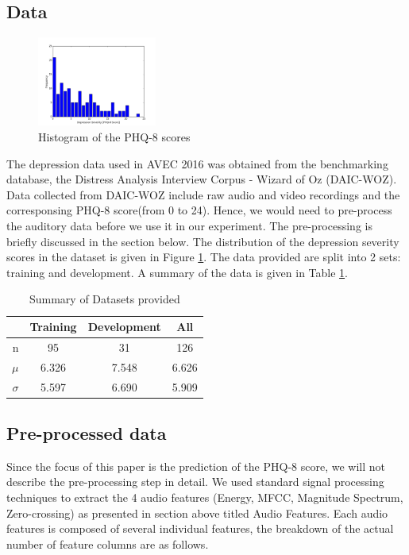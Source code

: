 \documentclass{article}
\begin{document}
	\subsection{Data}
	\begin{figure}[h]
	\center
 	\includegraphics[width=0.35\textwidth]{histogram_phq8}
	\caption{Histogram of the PHQ-8 scores}
	\label{histogram_phq8}
	\end{figure}
	
	The depression data used in AVEC 2016 was obtained from the benchmarking database, the Distress Analysis Interview Corpus - Wizard of Oz (DAIC-WOZ). 
	Data collected from DAIC-WOZ include raw audio and video recordings and the corresponsing PHQ-8 score(from 0 to 24)\cite{jad2008}. Hence, we would 
	need to pre-process the auditory data before we use it in our experiment. The pre-processing is briefly discussed in the section below.
	The distribution of the depression severity scores in the dataset is given in Figure \ref{histogram_phq8}. The data provided are split into 2 sets: training and development.
	A summary of the data is given in Table \ref{summary_table}.

 	\begin{table}[h]
 		\begin{center}
  			\begin{tabular}{ | r | c | c || c | }
    			\hline
			 & Training & Development & All \\ \hline\hline
			 n               & 95 & 31 & 126 \\ \hline
			 $\mu$           & 6.326 & 7.548 & 6.626 \\ \hline
			 $\sigma$        & 5.597 & 6.690 & 5.909 \\ \hline
			 \end{tabular}
		\end{center}
 	\caption{Summary of Datasets provided}
 	\label{summary_table}
 	\end{table}

    \subsection{Pre-processed data}
	Since the focus of this paper is the prediction of the PHQ-8 score, we will not describe the pre-processing step in detail.
	We used standard signal processing techniques to extract the 4 audio features (Energy, MFCC, Magnitude Spectrum, Zero-crossing) as presented in section above titled Audio Features.
	Each audio features is composed of several individual features, the breakdown of the actual number of feature columns are as follows.
\end{document}
